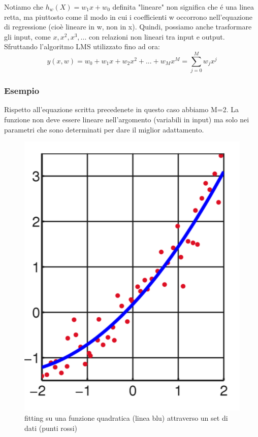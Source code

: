 \documentclass{article}
\begin{document}
Notiamo che $h_w(X)=w_1x+w_0$ definita "lineare" non significa che é una linea retta, ma piuttosto come il modo in cui i coefficienti w occorrono nell'equazione di regressione (cioè lineare in w, non in x). Quindi, possiamo anche trasformare gli input, come $x,x^2,x^3,...$ con relazioni non lineari tra input e output. Sfruttando l'algoritmo LMS utilizzato fino ad ora:
\begin{equation}
    y(x,w) = w_0+w_1x+w_2x^2+...+w_Mx^M=\sum_{j = 0}^M w_jx^j
\end{equation}

\subsubsection{Esempio}
Rispetto all'equazione scritta precedenete in questo caso abbiamo M=2. La funzione non deve essere lineare nell'argomento (variabili in input) ma solo nei parametri che sono determinati per dare il miglior adattamento. 
\begin{figure}[H]
    \centering
    \includegraphics[scale=0.35]{Images/quadraticfit.png}
    \caption{fitting su una funzione quadratica (linea blu) attraverso un set di dati (punti rossi)}
\end{figure}
\end{document}
